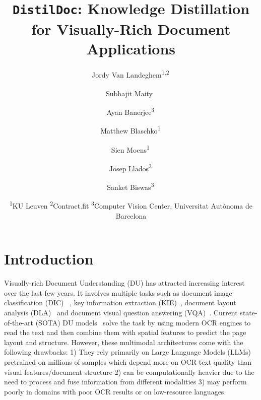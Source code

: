 \documentclass[runningheads]{llncs}
\begin{document}




\title{\texttt{DistilDoc}: Knowledge Distillation for Visually-Rich Document Applications} %

\newcommand{\superaffil}[2]{\textsuperscript{#1}\,#2}

\author{
  \small Jordy Van Landeghem\superaffil{1,2}\and
  \small Subhajit Maity \superaffil{}\and
  \small Ayan Banerjee\superaffil{3}\and
  \small Matthew Blaschko\superaffil{1}\and
  \small Sien Moens\superaffil{1}\and
  \small Josep Llados\superaffil{3}\and
  \small Sanket Biswas\superaffil{3}\and
  \and
  \footnotesize{
    \textsuperscript{1}KU Leuven
    \quad
    \textsuperscript{2}Contract.fit
    \quad
    \textsuperscript{3}Computer Vision Center, Universitat Autònoma de Barcelona}
}

\maketitle


\section{Introduction}
\label{sec:intro}

Visually-rich Document Understanding (DU) has attracted increasing interest over the last few years.
It involves multiple tasks such as document image classification (DIC) ~\cite{kang2014convolutional, harley2015evaluation, jain2019multimodal, liu2021document}, key information extraction (KIE)~\cite{liao2023doctr,luo2023geolayoutlm, simsa2023docile, jaume2019funsd, stanislawek2021kleister}, document layout analysis (DLA)~\cite{binmakhashen2019document, pfitzmann2022doclaynet, da2023vision, zhong2019publaynet, biswas2021beyond} and document visual question answering (VQA)~\cite{mathew2021docvqa, ding2022v, mathew2022infographicvqa, tito2021icdar}.
Current state-of-the-art (SOTA) DU models~\cite{huang2022layoutlmv3,gu2021unidoc} solve the task by using modern OCR engines to read the text and then combine them with spatial features to predict the page layout and structure. However, these multimodal architectures come with the following drawbacks: 1) They rely primarily on Large Language Models (LLMs) \cite{zhao2023survey} %
pretrained on millions of samples which depend more on OCR text quality than visual features/document structure 2) can be computationally heavier due to the need to process and fuse information from different modalities 3) may perform poorly in domains with poor OCR results or on low-resource languages.
\end{document}
